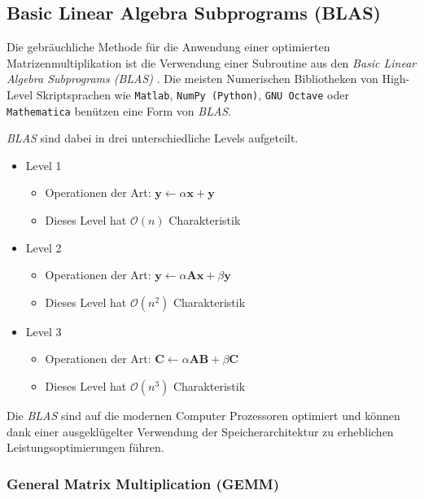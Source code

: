 \subsection{Basic Linear Algebra Subprograms (BLAS)}

Die gebräuchliche Methode f\"ur die Anwendung einer optimierten Matrizenmultiplikation ist die Verwendung einer Subroutine aus den \textit{Basic Linear Algebra Subprograms (BLAS)}  \cite{multiplikation:BLAS}.
Die meisten Numerischen Bibliotheken von High-Level Skriptsprachen wie \texttt{Matlab}, \texttt{NumPy (Python)}, \texttt{GNU Octave} oder \texttt{Mathematica} ben\"utzen eine Form von \textit{BLAS}.

\textit{BLAS} sind dabei in drei unterschiedliche Levels aufgeteilt.

\begin{itemize}
	\item Level 1
	\begin{itemize}
		\item Operationen der Art: $\mathbf{y} \leftarrow \alpha \mathbf{x}+\mathbf{y}$
		\item Dieses Level hat $\mathcal{O}(n)$ Charakteristik
	\end{itemize}
	\item Level 2
	\begin{itemize}
		\item Operationen der Art: $\mathbf{y} \leftarrow \alpha \mathbf{A}\mathbf{x}+\beta  \mathbf{y}$
		\item Dieses Level hat $\mathcal{O}\left(n^2\right)$ Charakteristik
		\end{itemize}
		\item Level 3
		\begin{itemize}
			\item Operationen der Art: $\mathbf{C} \leftarrow \alpha \mathbf{A}\mathbf{B}+\beta\mathbf{C}$
			\item Dieses Level hat $\mathcal{O}\left(n^3\right)$ Charakteristik
			\end{itemize}
\end{itemize}

Die \textit{BLAS} sind auf die modernen Computer Prozessoren optimiert und k\"onnen dank einer ausgeklügelter Verwendung der Speicherarchitektur zu erheblichen Leistungsoptimierungen f\"uhren.


\subsubsection{General Matrix Multiplication (GEMM)}

